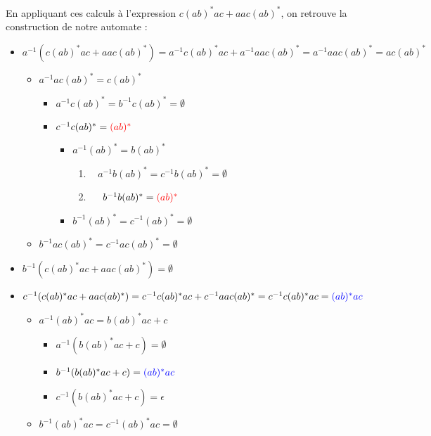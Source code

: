 \begin{example}
En appliquant ces calculs à l'expression $c(ab)^*ac + aac(ab)^*$, on retrouve la construction de notre automate :


\begin{itemize}
    \item $a^{-1}(c(ab)^*ac + aac(ab)^*) = a^{-1}c(ab)^*ac + a^{-1}aac(ab)^* = a^{-1}aac(ab)^* = ac(ab)^*$
    \begin{itemize}
        \item $a^{-1} ac(ab)^* = c(ab)^*$
        \begin{itemize}
            \item $a^{-1}c(ab)^* = b^{-1}c(ab)^* = \emptyset$
            \item $c^{-1}c(ab)^* = \textcolor{red}{(ab)^*}$
            \begin{itemize}
                \item $a^{-1}(ab)^* = b(ab)^*$
                \begin{enumerate}
                    \item[] $~~~~a^{-1}b(ab)^* = c^{-1}b(ab)^* = \emptyset$
                    \item[] $~~~~b^{-1}b(ab)^* = \textcolor{red}{(ab)^*}$
                \end{enumerate}
                \item $b^{-1}(ab)^* = c^{-1}(ab)^* = \emptyset$
            \end{itemize}
        \end{itemize}
        \item $b^{-1} ac(ab)^* = c^{-1} ac(ab)^* = \emptyset$
    \end{itemize}
    \item $b^{-1}(c(ab)^*ac + aac(ab)^*) = \emptyset$
    \item $c^{-1}(c(ab)^*ac + aac(ab)^*) = c^{-1}c(ab)^*ac + c^{-1}aac(ab)^* = c^{-1}c(ab)^*ac = \textcolor{blue}{(ab)^*ac}$
    \begin{itemize}
        \item $a^{-1}(ab)^*ac = b(ab)^*ac + c$
        \begin{itemize}
            \item $a^{-1}(b(ab)^*ac + c) = \emptyset$
            \item $b^{-1}(b(ab)^*ac + c) = \textcolor{blue}{(ab)^*ac}$
            \item $c^{-1}(b(ab)^*ac + c) = \epsilon$
        \end{itemize}
        \item $b^{-1}(ab)^*ac = c^{-1}(ab)^*ac = \emptyset$
    \end{itemize}
\end{itemize}
\end{example}


